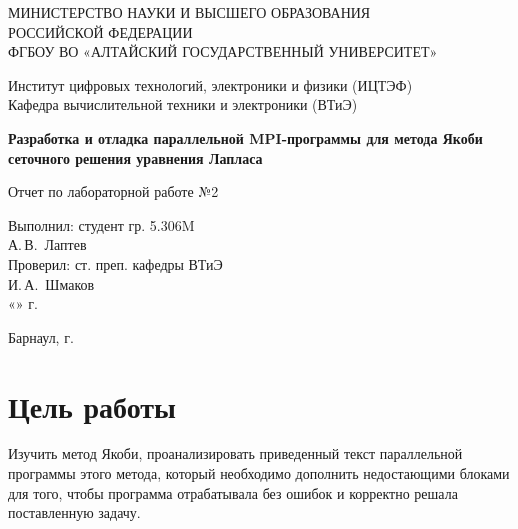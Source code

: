\documentclass{altsu-bachelor}
\begin{document}
\begin{titlepage}
 \begin{center}
    \normalsize
    МИНИСТЕРСТВО НАУКИ И ВЫСШЕГО ОБРАЗОВАНИЯ \\
    РОССИЙСКОЙ ФЕДЕРАЦИИ \\
    ФГБОУ ВО «АЛТАЙСКИЙ ГОСУДАРСТВЕННЫЙ УНИВЕРСИТЕТ»
    \vfill
     
    Институт цифровых технологий, электроники и физики (ИЦТЭФ) \\
    Кафедра вычислительной техники и электроники (ВТиЭ)
    \vfill
     
    \textbf{Разработка и отладка параллельной MPI-программы для метода Якоби сеточного решения уравнения Лапласа}
    
    Отчет по лабораторной работе №2
 \end{center}
\vfill
 
\newlength{\ML}
\hfill\begin{minipage}{0.41\textwidth}
  Выполнил: студент гр. 5.306M\\
  \underline{\hspace{\ML}} А.\,В.~Лаптев \\
  Проверил: ст. преп. кафедры ВТиЭ\\
  \underline{\hspace{\ML}} И.\,А.~Шмаков \\
  «\underline{\hspace{1cm}}» \underline{\hspace{3cm}} \the\year г.
\end{minipage}%
\vfill
 
\begin{center}
  Барнаул, \the\year г.
\end{center}
\end{titlepage}

\setcounter{page}{2}
\tableofcontents
\newpage

\section*{Цель работы}

Изучить метод Якоби, проанализировать приведенный текст параллельной программы этого метода, который необходимо дополнить недостающими блоками для того, чтобы программа отрабатывала без ошибок и корректно решала поставленную задачу.
\end{document}
